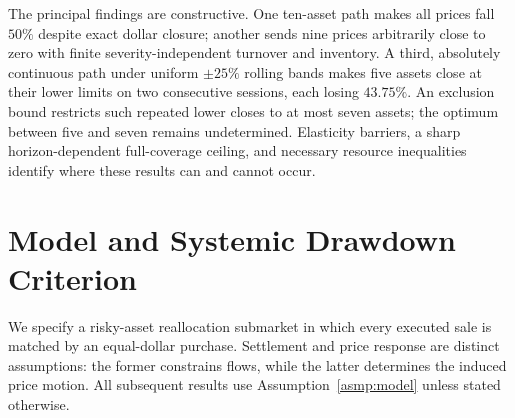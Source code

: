 \documentclass[review,hidelinks,onefignum,onetabnum]{siamonline250211}
\begin{document}


The principal findings are constructive. One ten-asset path makes all prices fall $50\%$ despite exact dollar closure; another sends nine prices arbitrarily close to zero with finite severity-independent turnover and inventory. A third, absolutely continuous path under uniform $\pm25\%$ rolling bands makes five assets close at their lower limits on two consecutive sessions, each losing $43.75\%$. An exclusion bound restricts such repeated lower closes to at most seven assets; the optimum between five and seven remains undetermined. Elasticity barriers, a sharp horizon-dependent full-coverage ceiling, and necessary resource inequalities identify where these results can and cannot occur.

\section{Model and Systemic Drawdown Criterion}\label{sec:micro}\label{sec:model}
We specify a risky-asset reallocation submarket in which every executed sale is matched by an equal-dollar purchase. Settlement and price response are distinct assumptions: the former constrains flows, while the latter determines the induced price motion. All subsequent results use Assumption~\ref{asmp:model} unless stated otherwise.
\end{document}
